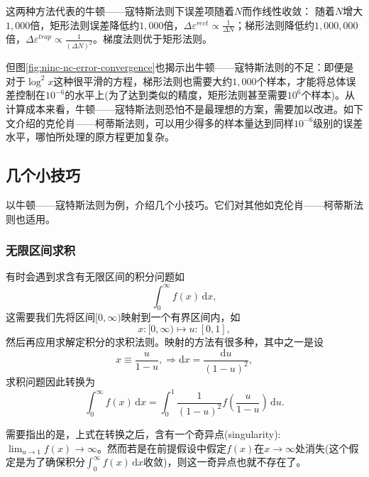 这两种方法代表的牛顿——寇特斯法则下误差项随着$N$而作线性收敛：
随着$N$增大$1,000$倍，矩形法则误差降低约$1,000$倍，$\Delta \varepsilon^{rect} \propto \frac{1}{\Delta N}$；梯形法则降低约$1,000,000$倍，$\Delta \varepsilon^{trap} \propto \frac{1}{ \left(\Delta N \right)^{2}}$。梯度法则优于矩形法则。

但图\ref{fig:ninc-nc-error-convergence}也揭示出牛顿——寇特斯法则的不足：即便是对于$\log^{2} x$这种很平滑的方程，梯形法则也需要大约$1,000$个样本，才能将总体误差控制在$10^{-6}$的水平上(为了达到类似的精度，矩形法则甚至需要$10^{6}$个样本)。从计算成本来看，牛顿——寇特斯法则恐怕不是最理想的方案，需要加以改进。如下文介绍的克伦肖——柯蒂斯法则，可以用少得多的样本量达到同样$10^{-6}$级别的误差水平，哪怕所处理的原方程更加复杂。

\subsection{几个小技巧}
\label{sec:ninc-tips}
以牛顿——寇特斯法则为例，介绍几个小技巧。它们对其他如克伦肖——柯蒂斯法则也适用。

\subsubsection{无限区间求积}
\label{sec:ninc-tips-improper-integral}
有时会遇到求含有无限区间的积分问题如
\begin{equation*}
  \int_{0}^{\infty} f(x) \, \mathrm{d} x,
\end{equation*}
这需要我们先将区间$[0, \infty)$映射到一个有界区间内，如
\begin{equation*}
  x:[0, \infty) \mapsto u:[0,1],
\end{equation*}
然后再应用求解定积分的求积法则。映射的方法有很多种，其中之一是设
\begin{equation*}
  x \equiv \frac{u}{1-u}, \Rightarrow \mathrm{d} x = \frac{\mathrm{d} u}{\left( 1 - u \right)^{2}},
\end{equation*}
求积问题因此转换为
\begin{equation*}
  \int_{0}^{\infty} f(x) \, \mathrm{d} x = \int_{0}^{1} \frac{1}{\left( 1 - u \right)^{2}} f
  \left( \frac{u}{1 - u} \right) \, \mathrm{d} u.
\end{equation*}

需要指出的是，上式在转换之后，含有一个奇异点(singularity):$\lim_{u \rightarrow 1} f(x) \rightarrow \infty$。然而若是在前提假设中假定$f(x)$在$x \rightarrow \infty$处消失(这个假定是为了确保积分$\int_{0}^{\infty} f(x) \, \mathrm{d} x$收敛)，则这一奇异点也就不存在了。


